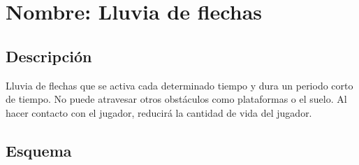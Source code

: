 		\section{Nombre: Lluvia de flechas}\label{obs.lluviaF}
	\subsection{Descripción}
	Lluvia de flechas que se activa cada determinado tiempo y dura un periodo corto de tiempo. No puede atravesar otros obstáculos como plataformas o el suelo. Al hacer contacto con el jugador, reducirá la cantidad de vida del jugador.
	\subsection{Esquema}
